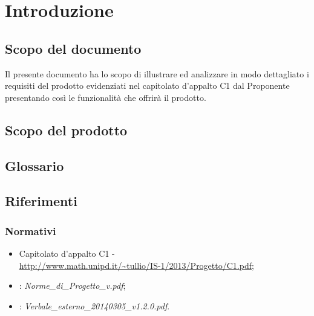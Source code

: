 \newpage
\tableofcontents

\newpage
\listoftables
\listoffigures

\newpage
\section{Introduzione}%
\subsection{Scopo del documento}%
Il presente documento ha lo scopo di illustrare ed analizzare in modo dettagliato i requisiti del prodotto  evidenziati nel capitolato d'appalto C1 dal Proponente \Prop{} presentando così le funzionalità che offrirà il prodotto.

\subsection{Scopo del prodotto} %
\Prodotto{}
\subsection{Glossario}%
\Glossario{}

\subsection{Riferimenti} %
\subsubsection{Normativi} %


\begin{itemize}
\item Capitolato d'appalto C1 - \Progetto{} \\
\url{http://www.math.unipd.it/~tullio/IS-1/2013/Progetto/C1.pdf};
\item {}: \emph{Norme\_{}di\_{}Progetto\_{}v\versioneNormeDiProgetto{}.pdf};\\
\item {}: \emph{Verbale\_esterno\_20140305\_v1.2.0.pdf}.
\end{itemize}

